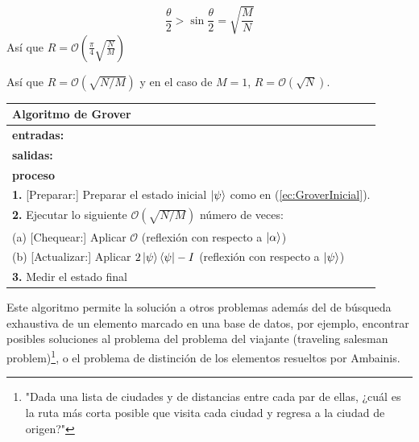 \begin{appendix}
\begin{equation}
    \frac{\theta}{2}>\sin\frac{\theta}{2}=\sqrt{\frac{M}{N}}
\end{equation}
Así que $R=\mathcal{O}(\frac{\pi}{4}\sqrt{\frac{N}{M}})$

Así que $R=\mathcal{O}(\sqrt{N/M})$ y en el caso de $M=1$, $R=\mathcal{O}(\sqrt{N})$.

\begin{center}
    \begin{tabular}{l}
    \hline \textbf{Algoritmo de Grover}\\\hline
    \textbf{entradas:} \\
    \textbf{salidas:}\\\hline
    \textbf{proceso}\\
    \textbf{1.} [Preparar:] Preparar el estado inicial $\ket{\psi}$ como en (\ref{ec:GroverInicial}).\\
\textbf{2.} Ejecutar lo siguiente $\mathcal{O}(\sqrt{N/M})$ número de veces:\\
(a) [Chequear:] Aplicar $\mathcal{O}$ (reflexión con respecto a $\ket{\alpha}$)\\
(b) [Actualizar:] Aplicar $2\ket{\psi}\bra{\psi}-I$ (reflexión con respecto a $\ket{\psi}$)\\
\textbf{3.} Medir el estado final\\\hline
    \end{tabular}{}
\end{center}{}
Este algoritmo permite la solución a otros problemas además del de búsqueda exhaustiva de un elemento marcado en una base de datos, por ejemplo, encontrar posibles soluciones al problema del problema del viajante (traveling salesman problem)\footnote{"Dada una lista de ciudades y de distancias entre cada par de ellas, ¿cuál es la ruta más corta posible que visita cada ciudad y regresa a la ciudad de origen?"}, o el problema de distinción de los elementos resueltos por Ambainis.


\end{appendix}